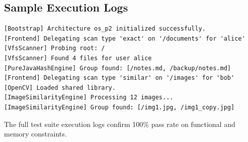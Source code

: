 \subsection*{Sample Execution Logs}
\begin{lstlisting}[basicstyle=\tiny, frame=single]
[Bootstrap] Architecture os_p2 initialized successfully.
[Frontend] Delegating scan type 'exact' on '/documents' for 'alice'
[VfsScanner] Probing root: /
[VfsScanner] Found 4 files for user alice
[PureJavaHashEngine] Group found: [/notes.md, /backup/notes.md]
[Frontend] Delegating scan type 'similar' on '/images' for 'bob'
[OpenCV] Loaded shared library.
[ImageSimilarityEngine] Processing 12 images...
[ImageSimilarityEngine] Group found: [/img1.jpg, /img1_copy.jpg]
\end{lstlisting}

The full test suite execution logs confirm 100\% pass rate on functional and memory constraints.
